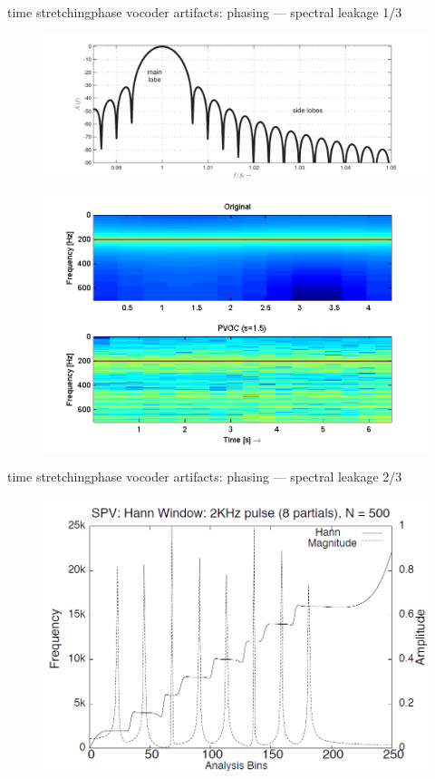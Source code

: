     \begin{frame}{time stretching}{phase vocoder artifacts: phasing --- spectral leakage 1/3}
            \begin{figure}
                \centering
                \includegraphics[scale=.3]{graph/SpectralLeakage}
            \end{figure}
            \begin{figure}
                \centerline{\includegraphics[scale=.5]{graph/PeakSmearingFreq}}
            \end{figure}
    \end{frame}
	\begin{frame}{time stretching}{phase vocoder artifacts: phasing --- spectral leakage 2/3}
			\begin{figure}
				\centerline{\includegraphics[scale=.4]{graph/instfreq}}
			\end{figure}
    \end{frame}
